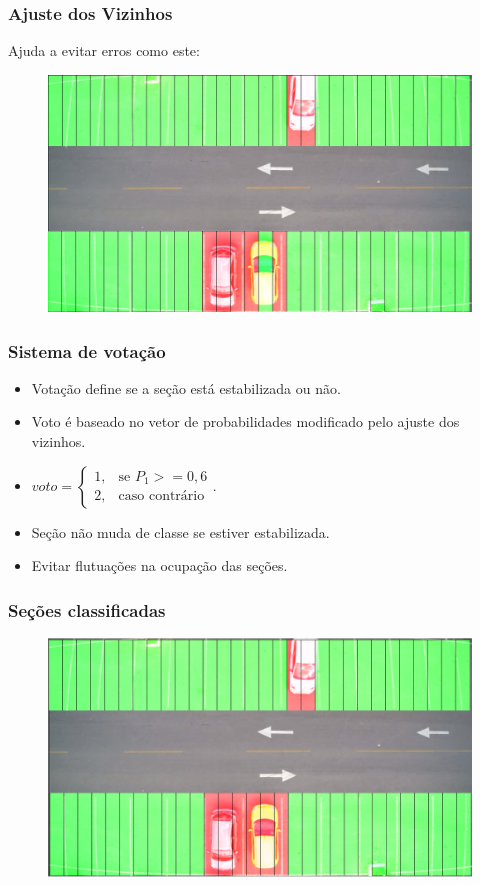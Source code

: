 \documentclass{beamer}
\begin{document}
\begin{frame}
\frametitle{Ajuste dos Vizinhos}
  Ajuda a evitar erros como este:
  \begin{figure}
	\centering
	\includegraphics[width=.4\textwidth]{erroMeio}
	\centering
\end{figure}
\end{frame}

\begin{frame}
\frametitle{Sistema de votação}
\begin{itemize}
\item Votação define se a seção está estabilizada ou não.
\item Voto é baseado no vetor de probabilidades modificado pelo ajuste dos vizinhos.
\item $voto= 
\begin{cases}
    1,& \text{se } P_1 >= 0,6\\
    2,& \text{caso contrário}
\end{cases}$.
\item Seção não muda de classe se estiver estabilizada.
\item Evitar flutuações na ocupação das seções.
\end{itemize}
\end{frame}

%

\begin{frame}
\frametitle{Seções classificadas}
  \begin{figure}
	\centering
	\includegraphics[width=.8\textwidth]{Classificada}
	\centering
\end{figure}
\end{frame}
\end{document}
